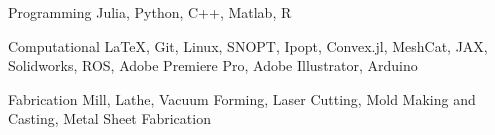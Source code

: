 

\begin{cvskills}

  \cvskill
    {Programming} %
    {Julia, Python, C++, Matlab, R} %

  \cvskill
    {Computational} %
    {\LaTeX, Git, Linux, SNOPT, Ipopt, Convex.jl, MeshCat, JAX, Solidworks, ROS, Adobe Premiere Pro, Adobe Illustrator, Arduino} %

  \cvskill
    {Fabrication} %
    {Mill, Lathe, Vacuum Forming, Laser Cutting, Mold Making and Casting, Metal Sheet Fabrication} %

\end{cvskills}
